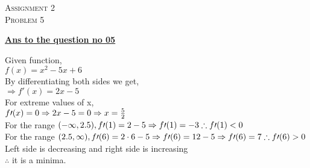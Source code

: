 \documentclass{article}
\begin{document}
\begin{newpage}
\begin{flushright}
    \textsc{Assignment 2}\\
    \textsc{Problem 5}\\
    [0.5 cm]
    \end{flushright}
\begin{center}
  \textbf{\Large \underline {Ans to the question no 05}}\\
  [0.5 cm]
\end{center}
\Large {Given function,\\[2mm]
$f(x)=x^2-5x+6$\\[3mm]
By differentiating both sides we get, \\[2mm]
$\Rightarrow f\prime(x)=2x-5$\\[3mm]
For extreme values of x, \\[2mm]
$ f\prime(x)=0\\[2mm]
\Rightarrow 2x-5=0\\[2mm]
\Rightarrow x= \frac{5}{2}$\\[3mm]
For the range $(-\infty, 2.5),\\[2mm]
f\prime(1)=2-5\\[2mm]
\Rightarrow f\prime(1)= -3\\[2mm]
\therefore  f\prime(1)<0 $\\[3mm]
For the range $(2.5,\infty),\\[2mm]
f\prime(6)= 2\cdot6-5\\[2mm]
\Rightarrow f\prime(6)= 12-5\\[2mm]
\Rightarrow f\prime(6)=7\\[2mm]
\therefore f\prime(6)>0$\\[3mm]
Left side is decreasing and right side is increasing\\[3mm]
$\therefore$ it is a minima.}
\end{newpage}
\end{document}
